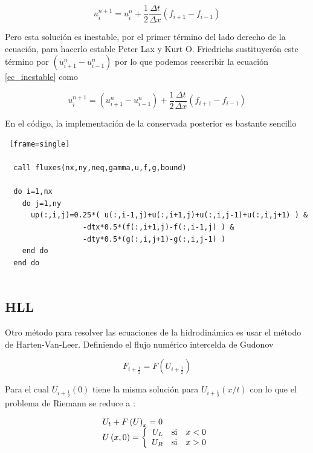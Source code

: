 \documentclass[12pt,a4paper]{book}
\begin{document}
\begin{equation}\label{ec_inestable}
u_i^{n+1} = u_i^{n} + \frac{1}{2}\frac{\Delta t}{\Delta x} \left(f_{i+1} - f_{i-1} \right)
\end{equation}

Pero esta solución es inestable, por el primer término del lado derecho de la ecuación, para hacerlo estable  Peter Lax y Kurt O. Friedrichs sustituyerón este término por $(u_{i+1}^n-u_{i-1}^n)$  por lo que podemos reescribir la ecuación \ref{ec_inestable} como

\begin{equation}\label{ec_estable}
u_i^{n+1} =(u_{i+1}^n-u_{i-1}^n) + \frac{1}{2}\frac{\Delta t}{\Delta x} \left(f_{i+1} - f_{i-1} \right)
\end{equation}

En el código, la implementación de la conservada posterior es bastante sencillo

\begin{lstlisting} [frame=single]

  call fluxes(nx,ny,neq,gamma,u,f,g,bound)

  do i=1,nx
    do j=1,ny
      up(:,i,j)=0.25*( u(:,i-1,j)+u(:,i+1,j)+u(:,i,j-1)+u(:,i,j+1) ) &
                  -dtx*0.5*(f(:,i+1,j)-f(:,i-1,j) ) &
                  -dty*0.5*(g(:,i,j+1)-g(:,i,j-1) )
    end do
  end do
  
\end{lstlisting}





\subsection{HLL}

	Otro método para resolver las ecuaciones de la hidrodinámica es usar el método de Harten-Van-Leer. Definiendo el flujo numérico intercelda de Gudonov

\begin{equation}
F_{i+\frac{1}{2}}=F \left( U_{i+\frac{1}{2}} \right)
\end{equation}

Para el cual $U_{i+\frac{1}{2}}(0)$ tiene la misma solución para $U_{i+\frac{1}{2}}(x/t)$ con lo que el problema de Riemann se reduce a :

\begin{equation} \label{Ecuacion_discreta_conservada}
\begin{array}{ll}
U_t + F \left( U \right)_x = 0 \\
U \left(x,0 \right) = 
\left\lbrace
\begin{array}{rr}
U_L \quad \textup{si} \quad x<0  \\
U_R \quad \textup{si} \quad x>0
\end{array}
\right.
\end{array}
\end{equation}
\end{document}

